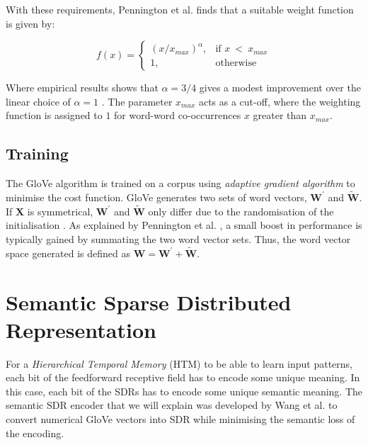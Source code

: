 With these requirements, Pennington et al. \cite{pennington2014glove} finds that a suitable weight function is given by:


\begin{equation}
    \label{eq:xmax}
    f(x) = 
        \begin{cases}
            (x/x_{max})^{\alpha},&\text{if } x\ <\ x_{max}\\
            1,&\text{otherwise}
        \end{cases}
\end{equation}

Where empirical results shows that $\alpha = 3/4$ gives a modest improvement over the linear choice of $\alpha = 1$ \cite{pennington2014glove}. The parameter $x_{max}$ acts as a cut-off, where the weighting function is assigned to $1$ for word-word co-occurrences $x$ greater than $x_{max}$.

\subsection{Training}
The GloVe algorithm is trained on a corpus using \textit{adaptive gradient algorithm} to minimise the cost function. GloVe generates two sets of word vectors, $\boldsymbol{W}^{\prime}$ and $\boldsymbol{\tilde{W}}$. If $\boldsymbol{X}$ is symmetrical, $\boldsymbol{W}^{\prime}$ and $\boldsymbol{\tilde{W}}$ only differ due to the randomisation of the initialisation \cite{pennington2014glove}. As explained by Pennington et al. \cite{pennington2014glove}, a small boost in performance is typically gained by summating the two word vector sets. Thus, the word vector space generated is defined as $\boldsymbol{W} = \boldsymbol{W}^{\prime} + \boldsymbol{\tilde{W}}$.




\section{Semantic Sparse Distributed Representation}
\label{sec:SDRencode}
For a \textit{Hierarchical Temporal Memory} (HTM) to be able to learn input patterns, each bit of the feedforward receptive field has to encode some unique meaning. In this case, each bit of the SDRs has to encode some unique semantic meaning. The semantic SDR encoder that we will explain was developed by Wang et al. \cite{7844355} to convert numerical GloVe vectors into SDR while minimising the semantic loss of the encoding.



